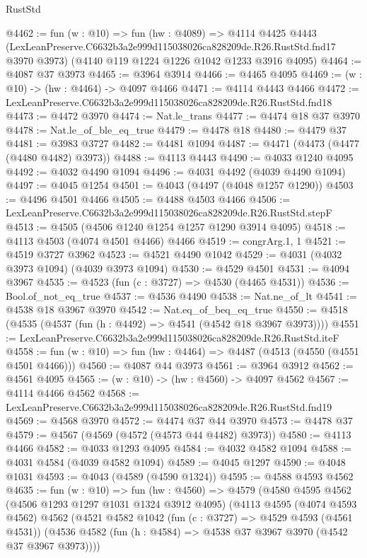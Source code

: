 \begin{lexlean}{RustStd}
\begin{coremodule}
@4462 := fun (w : @10) =>
  fun (hw : @4089) =>
  @4114
    @4425
    @4443
    (LexLeanPreserve.C6632b3a2e999d115038026ca828209de.R26.RustStd.fnd17 @3970 @3973)
    (@4140 @119 @1224 @1226 @1042 @1233 @3916 @4095)
@4464 := @4087 @37 @3973
@4465 := @3964 @3914
@4466 := @4465 @4095
@4469 := (w : @10) -> (hw : @4464) -> @4097 @4466
@4471 := @4114 @4443 @4466
@4472 := LexLeanPreserve.C6632b3a2e999d115038026ca828209de.R26.RustStd.fnd18
@4473 := @4472 @3970
@4474 := Nat.le_trans
@4477 := @4474 @18 @37 @3970
@4478 := Nat.le_of_ble_eq_true
@4479 := @4478 @18
@4480 := @4479 @37
@4481 := @3983 @3727
@4482 := @4481 @1094
@4487 := @4471 (@4473 (@4477 (@4480 @4482) @3973))
@4488 := @4113 @4443
@4490 := @4033 @1240 @4095
@4492 := @4032 @4490 @1094
@4496 := @4031 @4492 (@4039 @4490 @1094)
@4497 := @4045 @1254
@4501 := @4043 (@4497 (@4048 @1257 @1290))
@4503 := @4496 @4501 @4466
@4505 := @4488 @4503 @4466
@4506 := LexLeanPreserve.C6632b3a2e999d115038026ca828209de.R26.RustStd.stepF
@4513 := @4505 (@4506 @1240 @1254 @1257 @1290 @3914 @4095)
@4518 := @4113 @4503 (@4074 @4501 @4466) @4466
@4519 := congrArg.{1, 1}
@4521 := @4519 @3727 @3962
@4523 := @4521 @4490 @1042
@4529 := @4031 (@4032 @3973 @1094) (@4039 @3973 @1094)
@4530 := @4529 @4501
@4531 := @4094 @3967
@4535 := @4523 (fun (c : @3727) => @4530 (@4465 @4531))
@4536 := Bool.of_not_eq_true
@4537 := @4536 @4490
@4538 := Nat.ne_of_lt
@4541 := @4538 @18 @3967 @3970
@4542 := Nat.eq_of_beq_eq_true
@4550 := @4518 (@4535 (@4537 (fun (h : @4492) => @4541 (@4542 @18 @3967 @3973))))
@4551 := LexLeanPreserve.C6632b3a2e999d115038026ca828209de.R26.RustStd.iteF
@4558 := fun (w : @10) => fun (hw : @4464) => @4487 (@4513 (@4550 (@4551 @4501 @4466)))
@4560 := @4087 @44 @3973
@4561 := @3964 @3912
@4562 := @4561 @4095
@4565 := (w : @10) -> (hw : @4560) -> @4097 @4562
@4567 := @4114 @4466 @4562
@4568 := LexLeanPreserve.C6632b3a2e999d115038026ca828209de.R26.RustStd.fnd19
@4569 := @4568 @3970
@4572 := @4474 @37 @44 @3970
@4573 := @4478 @37
@4579 := @4567 (@4569 (@4572 (@4573 @44 @4482) @3973))
@4580 := @4113 @4466
@4582 := @4033 @1293 @4095
@4584 := @4032 @4582 @1094
@4588 := @4031 @4584 (@4039 @4582 @1094)
@4589 := @4045 @1297
@4590 := @4048 @1031
@4593 := @4043 (@4589 (@4590 @1324))
@4595 := @4588 @4593 @4562
@4635 := fun (w : @10) =>
  fun (hw : @4560) =>
  @4579
    (@4580
      @4595
      @4562
      (@4506 @1293 @1297 @1031 @1324 @3912 @4095)
      (@4113
        @4595
        (@4074 @4593 @4562)
        @4562
        (@4521
          @4582
          @1042
          (fun (c : @3727) => @4529 @4593 (@4561 @4531))
          (@4536 @4582 (fun (h : @4584) => @4538 @37 @3967 @3970 (@4542 @37 @3967 @3973))))

\end{coremodule}
\end{lexlean}
